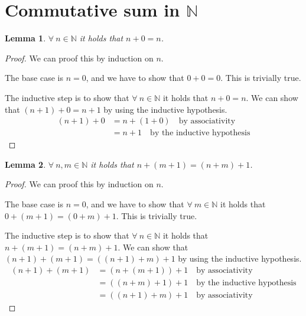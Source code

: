 \documentclass[a4paper]{article}
\newtheorem{lemma}{Lemma}
\begin{document}

\setlength{\parindent}{0pt}
\setlength{\parskip}{0.8em}



\section{Commutative sum in \(\mathbb{N}\)}

\begin{lemma}\label{lemma:commutative_sum_zero}
  \(\forall \ n \in \mathbb{N}\) it holds that \(n + 0 = n\).
\end{lemma}

\begin{proof}
  We can proof this by induction on \(n\).

  The base case is \(n = 0\), and we have to show that \(0 + 0 = 0\). This is trivially true.

  The inductive step is to show that \(\forall \ n \in \mathbb{N}\) it holds that \(n + 0 = n\).
  We can show that \((n + 1) + 0 = n + 1\) by using the inductive hypothesis.
  \begin{align*}
    (n + 1) + 0 &= n + (1 + 0) \quad \text{by associativity} \\
                &= n + 1 \quad \text{by the inductive hypothesis}
  \end{align*}
\end{proof}

\begin{lemma}\label{lemma:associative_sum}
  \(\forall \ n, m \in \mathbb{N}\) it holds that \(n + (m + 1) = (n + m) + 1\).
\end{lemma}

\begin{proof}
  We can proof this by induction on \(n\).

  The base case is \(n = 0\), and we have to show that \(\forall \ m \in \mathbb{N}\) it holds that \(0 + (m + 1) = (0 + m) + 1\). This is trivially true.

  The inductive step is to show that \(\forall \ n \in \mathbb{N}\) it holds that \(n + (m + 1) = (n + m) + 1\).
  We can show that \((n + 1) + (m + 1) = ((n + 1) + m) + 1\) by using the inductive hypothesis.
  \begin{align*}
    (n + 1) + (m + 1) &= (n + (m + 1)) + 1 \quad \text{by associativity} \\
                      &= ((n + m) + 1) + 1 \quad \text{by the inductive hypothesis} \\
                      &= ((n + 1) + m) + 1 \quad \text{by associativity}
  \end{align*}

\end{proof}
\end{document}
